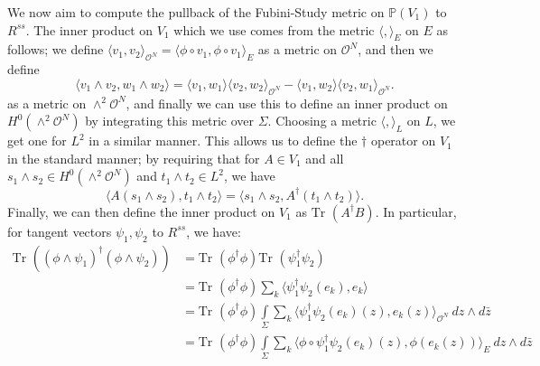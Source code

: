 \documentclass[]{article}
\newcommand{\C}{\mathbb{C}}
\newcommand{\OO}{\mathcal{O}}
\newcommand{\PP}{\mathbb{P}}
\newcommand{\Tr}{\text{Tr }}
\begin{document}
	
	We now aim to compute the pullback of the Fubini-Study metric on $\PP(V_1)$ to $R^{ss}$. The inner product on $V_1$ which we use comes from the metric $\langle, \rangle_E$ on $E$ as follows; we define $\langle v_1, v_2 \rangle_{\OO^N} = \langle \phi\circ v_1, \phi\circ v_1\rangle_E$ as a metric on $\OO^N$, and then we define 
	\begin{equation}
		\langle v_1 \wedge v_2, w_1 \wedge w_2 \rangle = \langle v_1, w_1\rangle\langle v_2,w_2\rangle_{\OO^N} - \langle v_1,w_2\rangle\langle v_2,w_1\rangle_{\OO^N}.
	\end{equation}
	as a metric on $\wedge^2 \OO^N$, and finally we can use this to define an inner product on $H^0(\wedge^2 \OO^N)$ by integrating this metric over $\Sigma$. Choosing a metric $\langle, \rangle_L$ on $L$, we get one for $L^2$ in a similar manner. This allows us to define the $\dagger$ operator on $V_1$ in the standard manner; by requiring that for $A\in V_1$ and all $s_1 \wedge s_2 \in H^0(\wedge^2 \OO^N)$ and $t_1\wedge t_2 \in L^2$, we have
	\begin{equation}
		\langle A(s_1 \wedge s_2), t_1\wedge t_2 \rangle = \langle s_1 \wedge s_2, A^\dagger(t_1 \wedge t_2)\rangle.
	\end{equation}
	Finally, we can then define the inner product on $V_1$ as $\Tr(A^\dagger B)$. In particular, for tangent vectors $\psi_1, \psi_2$ to $R^{ss}$, we have:
	\begin{align*}
		\Tr((\phi \wedge \psi_1)^\dagger (\phi \wedge \psi_2)) &= \Tr(\phi^\dagger \phi)\Tr(\psi_1^\dagger \psi_2) \\
		&= \Tr(\phi^\dagger \phi)\sum_{k} \langle \psi_1^\dagger\psi_2(e_k), e_k\rangle\\
		&= \Tr(\phi^\dagger \phi)\int\limits_{\Sigma} \sum_k \langle \psi_1^\dagger \psi_2(e_k)(z), e_k(z)\rangle_{\OO^N}~dz\wedge d\bar{z}\\
		&= \Tr(\phi^\dagger \phi)\int\limits_{\Sigma} \sum_k \langle \phi\circ \psi_1^\dagger \psi_2(e_k)(z), \phi(e_k(z))\rangle_E ~dz\wedge d\bar{z}
	\end{align*}
	\iffalse
	Now we add in the parabolic structure. At a puncture $p_i$, the map $\alpha_i:E\to \C_{p_i}$ acts on global sections $\sigma \in \Gamma(E)$ by
	\begin{equation}
		\alpha_i(\sigma) = \alpha_i(\sigma(p_i)),
	\end{equation}
	and we call this action $\hat{\alpha_i}$, in 
	\begin{equation}
		V_2 := H^0(\OO^N)^\ast.
	\end{equation}
	We get one copy of $V_2$ for each puncture. Furthermore, parabolic structures are only up to the independent scale of the $\alpha_i$, so we represent the equivalence class of $(E,\alpha)$ as \begin{equation}
	[\hat{\beta}],[\hat{\alpha}])\in \PP(V_1)\times_{i=1}^n \PP(V_2).
	\end{equation}
	Let $X$ denote the closed subvariety of this space consisting of the image of Quot under the above injection.
	\fi
	
\end{document}
